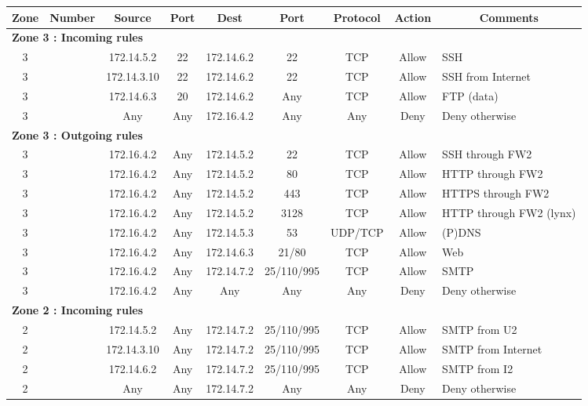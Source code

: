 \documentclass[a4paper,titlepage]{article}
\begin{document}
\begin{landscape}
	\begin{table}[h]
		\centering
		\begin{tabular}{c|c|cc|cc|ccl}
			Zone & Number & Source & Port & Dest & Port & Protocol & Action & \multicolumn{1}{c}{Comments}\\
			\hline
			\multicolumn{9}{l}{\textbf{Zone 3 : Incoming rules}}\\
			3 &  & 172.14.5.2 & 22 & 172.14.6.2 & 22 & TCP & Allow & SSH\\
			3 &  & 172.14.3.10 & 22 & 172.14.6.2 & 22 & TCP & Allow & SSH from Internet\\
			3 &  & 172.14.6.3 & 20 & 172.14.6.2 & Any & TCP & Allow & FTP (data)\\
			3 &  & Any & Any & 172.16.4.2 & Any & Any & Deny & Deny otherwise\\

			\hline
			\multicolumn{9}{l}{\textbf{Zone 3 : Outgoing rules}}\\
			3 &  & 172.16.4.2 & Any & 172.14.5.2 & 22 & TCP & Allow & SSH through FW2\\
			3 &  & 172.16.4.2 & Any & 172.14.5.2 & 80 & TCP & Allow & HTTP through FW2\\
			3 &  & 172.16.4.2 & Any & 172.14.5.2 & 443 & TCP & Allow & HTTPS through FW2\\
			3 &  & 172.16.4.2 & Any & 172.14.5.2 & 3128 & TCP & Allow & HTTP through FW2 (lynx) \\
			3 &  & 172.16.4.2 & Any & 172.14.5.3 & 53 & UDP/TCP & Allow & (P)DNS\\
			3 &  & 172.16.4.2 & Any & 172.14.6.3 & 21/80 & TCP & Allow & Web\\
			3 &  & 172.16.4.2 & Any & 172.14.7.2 & 25/110/995 & TCP & Allow & SMTP\\
			3 &  & 172.16.4.2 & Any & Any & Any & Any & Deny & Deny otherwise\\

			\hline
			\multicolumn{9}{l}{\textbf{Zone 2 : Incoming rules}}\\
			2 &  & 172.14.5.2 & Any & 172.14.7.2 & 25/110/995 & TCP & Allow & SMTP from U2\\
			2 &  & 172.14.3.10 & Any & 172.14.7.2 & 25/110/995 & TCP & Allow & SMTP from Internet\\
			2 &  & 172.14.6.2 & Any & 172.14.7.2 & 25/110/995 & TCP & Allow & SMTP from I2\\
			2 &  & Any & Any & 172.14.7.2 & Any & Any & Deny & Deny otherwise\\


\end{tabular}
\end{table}
\end{landscape}
\end{document}
